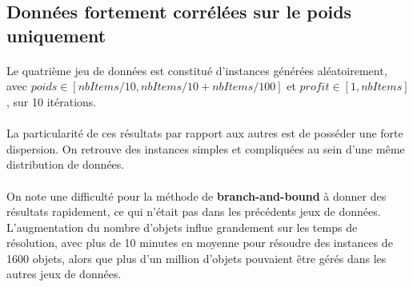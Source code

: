 \documentclass[12pt]{article}
\begin{document}
\subsection{Données fortement corrélées sur le poids uniquement}

\paragraph{}Le quatrième jeu de données est constitué d'instances générées aléatoirement, avec $poids \in [nbItems/10, nbItems/10+nbItems/100]$ et $profit \in [1,nbItems]$, sur 10 itérations.

\begin{figure}[!h]
\begin{floatrow}
\end{floatrow}
\end{figure}

\paragraph{}La particularité de ces résultats par rapport aux autres est de posséder une forte dispersion. On retrouve des instances simples et compliquées au sein d'une même distribution de données.
\paragraph{}On note une difficulté pour la méthode de \textbf{branch-and-bound} à donner des résultats rapidement, ce qui n'était pas dans les précédents jeux de données. L'augmentation du nombre d'objets influe grandement sur les temps de résolution, avec plus de 10 minutes en moyenne pour résoudre des instances de 1600 objets, alors que plus d'un million d'objets pouvaient être gérés dans les autres jeux de données.
\end{document}
